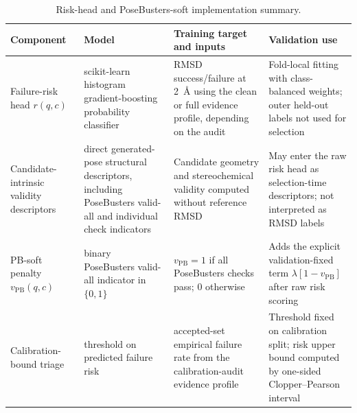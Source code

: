 \begin{table}[!ht]
\centering
\caption{Risk-head and PoseBusters-soft implementation summary.}
\label{tab:s_model_heads}
\footnotesize
\setlength{\tabcolsep}{3pt}
\begin{tabular}{>{\raggedright\arraybackslash}p{}>{\raggedright\arraybackslash}p{}>{\raggedright\arraybackslash}p{}>{\raggedright\arraybackslash}p{}}
\toprule
Component & Model & Training target and inputs & Validation use \\
\midrule
Failure-risk head $r(q,c)$ & scikit-learn histogram gradient-boosting probability classifier & RMSD success/failure at 2~\AA{} using the clean or full evidence profile, depending on the audit & Fold-local fitting with class-balanced weights; outer held-out labels not used for selection \\
Candidate-intrinsic validity descriptors & direct generated-pose structural descriptors, including PoseBusters valid-all and individual check indicators & Candidate geometry and stereochemical validity computed without reference RMSD & May enter the raw risk head as selection-time descriptors; not interpreted as RMSD labels \\
PB-soft penalty $v_{\mathrm{PB}}(q,c)$ & binary PoseBusters valid-all indicator in $\{0,1\}$ & $v_{\mathrm{PB}}=1$ if all PoseBusters checks pass; $0$ otherwise & Adds the explicit validation-fixed term $\lambda[1-v_{\mathrm{PB}}]$ after raw risk scoring \\
Calibration-bound triage & threshold on predicted failure risk & accepted-set empirical failure rate from the calibration-audit evidence profile & Threshold fixed on calibration split; risk upper bound computed by one-sided Clopper--Pearson interval \\
\bottomrule
\end{tabular}
\end{table}
